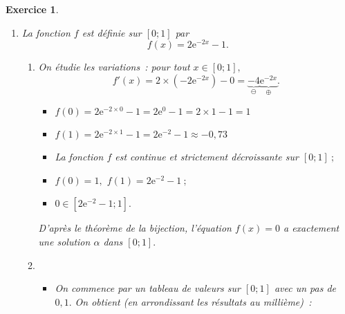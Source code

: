 \documentclass[10pt]{article}
\newtheorem{exo}{Exercice}
\begin{document}
\begin{exo}

\begin{enumerate}
\item La fonction $f$ est définie sur $\left[0;1\right]$ par \[f(x)=2\text{e}^{-2x}-1.\]

\begin{enumerate}
  \item On étudie les variations~: pour tout $x\in\left[0;1\right],$
  \[f'(x)=2\times \left(-2\text{e}^{-2x}\right)-0=\underbrace{-4}_{\ominus}\underbrace{\text{e}^{-2x}}_{\oplus}.\]
  
 \medskip

\setlength{\columnseprule}{1pt}

\begin{multicols}{2}
\begin{center}
\end{center}

\columnbreak

\begin{itemize}
\item[\textbullet] $f(0)=2\text{e}^{-2\times 0}-1=2\text{e}^{0}-1=2\times 1-1=1$
\item[\textbullet] $f(1)=2\text{e}^{-2\times 1}-1=2\text{e}^{-2}-1\approx -0,73$
\end{itemize}


\end{multicols}
  
  \begin{itemize}
\item[\textbullet] La fonction $f$ est continue et strictement décroissante sur $\left[0;1\right]~;$
\item[\textbullet] $f(0)=1,$ $f(1)=2\text{e}^{-2}-1~;$
\item[\textbullet] $0\in\left[2\text{e}^{-2}-1;1\right].$
\end{itemize}

D'après le théorème de la bijection, l'équation $f(x)=0$ a exactement une solution  $\alpha$ dans $\left[0;1\right].$

  \item \begin{itemize}
\item[\textbullet] On commence par un tableau de valeurs sur $\left[0;1\right]$ avec un pas de $0,1.$ On obtient (en arrondissant les résultats au millième)~:


\end{itemize}
\end{enumerate}
\end{enumerate}
\end{exo}
\end{document}
